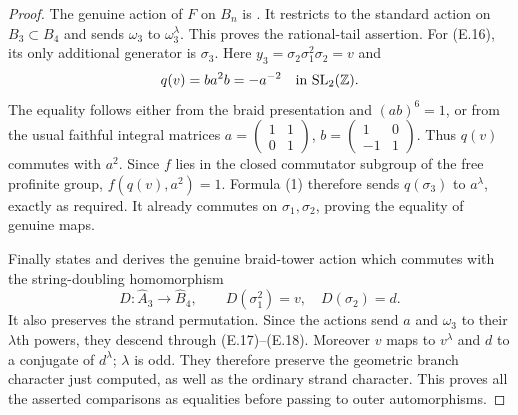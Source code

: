 \begin{proof}
The genuine action of $F$ on $B_n$ is
\cite[formula (1)]{ET_HS2000}.  It restricts to the standard
action on $B_3\subset B_4$ and sends $\omega _3$ to
$\omega _3^\lambda$.  This proves the rational-tail assertion.
For (E.16), its only additional generator is $\sigma _3$.
Here $y_3=\sigma _2\sigma _1^2\sigma _2=v$ and
\[
 q(v)=ba^2b=-a^{-2}\quad\hbox{in }\mathrm{SL}_2(\mathbb Z).
\]
The equality follows either from the braid presentation and
$(ab)^6=1$, or from the usual faithful integral matrices
$a=\left(\begin{smallmatrix}1&1\\0&1\end{smallmatrix}\right)$,
$b=\left(\begin{smallmatrix}1&0\\-1&1\end{smallmatrix}\right)$.
Thus $q(v)$ commutes with $a^2$.  Since $f$ lies in the
closed commutator subgroup of the free profinite group,
$f(q(v),a^2)=1$.  Formula (1) therefore sends $q(\sigma _3)$
to $a^\lambda$, exactly as required.  It already commutes on
$\sigma _1,\sigma _2$, proving the equality of genuine maps.

Finally \cite[\S0.3, pp.~7--8]{ET_HS2000} states and derives
the genuine braid-tower action which commutes with the
string-doubling homomorphism
\[
 D:\widehat A_3\longrightarrow\widehat B_4,
 \qquad D(\sigma _1^2)=v,\quad D(\sigma _2)=d.
\]
It also preserves the strand permutation.  Since the actions
send $a$ and $\omega _3$ to their $\lambda$th powers, they
descend through (E.17)--(E.18).  Moreover $v$ maps to $v^\lambda$
and $d$ to a conjugate of $d^\lambda$; $\lambda$ is odd.
They therefore preserve the geometric branch character just
computed, as well as the ordinary strand character.
This proves all the asserted comparisons as equalities before
passing to outer automorphisms.
\end{proof}

